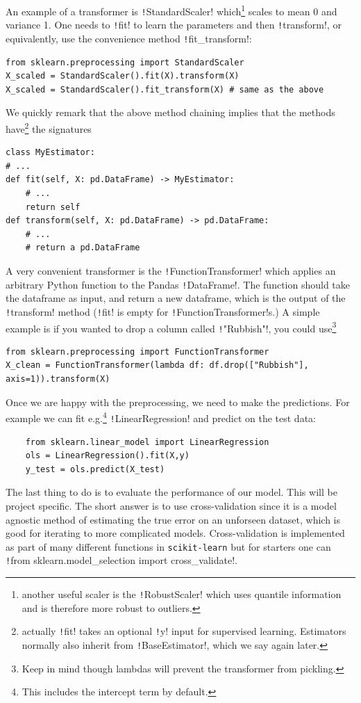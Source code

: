 \documentclass[11pt]{article}
\theoremstyle{definition}
\begin{document}
An example of a transformer is \texttt!StandardScaler! which\footnote{another useful scaler is the \texttt!RobustScaler! which uses quantile information and is therefore more robust to outliers.} scales to mean 0 and variance 1. 
One needs to \texttt!fit! to learn the parameters and then \texttt!transform!, or equivalently, use the convenience method \texttt!fit_transform!:
\begin{verbatim}
from sklearn.preprocessing import StandardScaler
X_scaled = StandardScaler().fit(X).transform(X) 
X_scaled = StandardScaler().fit_transform(X) # same as the above
\end{verbatim}
We quickly remark that the above method chaining implies that the methods have\footnote{actually \texttt!fit! takes an optional \texttt!y! input for supervised learning. Estimators normally also inherit from \texttt!BaseEstimator!, which we say again later.} the signatures
\begin{verbatim}
class MyEstimator:
# ...
def fit(self, X: pd.DataFrame) -> MyEstimator: 
    # ...
    return self
def transform(self, X: pd.DataFrame) -> pd.DataFrame: 
    # ...
    # return a pd.DataFrame
\end{verbatim}
A very convenient transformer is the \texttt!FunctionTransformer! which applies an arbitrary Python function to the Pandas \texttt!DataFrame!. The function should take the dataframe as input, and return a new dataframe, which is the output of the \texttt!transform! method (\texttt!fit! is empty for \texttt!FunctionTransformer!s.) A simple example is if you wanted to drop a column called \texttt!"Rubbish"!, you could use\footnote{Keep in mind though lambdas will prevent the transformer from pickling.}
\begin{verbatim}
from sklearn.preprocessing import FunctionTransformer
X_clean = FunctionTransformer(lambda df: df.drop(["Rubbish"], axis=1)).transform(X)
\end{verbatim}

Once we are happy with the preprocessing, we need to make the predictions. For example we can fit e.g.\footnote{This includes the intercept term by default.} \texttt!LinearRegression! and predict on the test data:
\begin{verbatim}
    from sklearn.linear_model import LinearRegression
    ols = LinearRegression().fit(X,y)
    y_test = ols.predict(X_test)
\end{verbatim}
The last thing to do is to evaluate the performance of our model. This will be project specific. The short answer is to use cross-validation since it is a model agnostic method of estimating the true error on an unforseen dataset, which is good for iterating to more complicated models. Cross-validation is implemented as part of many different functions in \texttt{scikit-learn} but for starters one can \texttt!from sklearn.model_selection import cross_validate!. 
\end{document}
